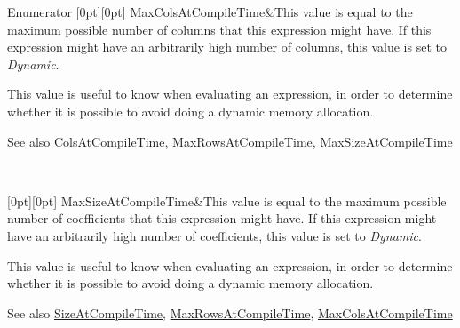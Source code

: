 \begin{DoxyEnumFields}{Enumerator}
[0pt][0pt]{}\mbox{\label{class_eigen_1_1_dense_base_a86241c772c74c04eeeb0480b99c5ab77acc3a41000cf1d29dd1a320b2a09d2a65}} 
Max\+Cols\+At\+Compile\+Time&This value is equal to the maximum possible number of columns that this expression might have. If this expression might have an arbitrarily high number of columns, this value is set to {\itshape Dynamic}.

This value is useful to know when evaluating an expression, in order to determine whether it is possible to avoid doing a dynamic memory allocation.

\begin{DoxySeeAlso}{See also}
\mbox{\hyperlink{class_eigen_1_1_dense_base_a86241c772c74c04eeeb0480b99c5ab77a787f85fd67ee5985917eb2cef6e70441}{Cols\+At\+Compile\+Time}}, \mbox{\hyperlink{class_eigen_1_1_dense_base_a86241c772c74c04eeeb0480b99c5ab77ad2baadea085372837b0e80dc93be1306}{Max\+Rows\+At\+Compile\+Time}}, \mbox{\hyperlink{class_eigen_1_1_dense_base_a86241c772c74c04eeeb0480b99c5ab77a3a459062d39cb34452518f5f201161d2}{Max\+Size\+At\+Compile\+Time}} 
\end{DoxySeeAlso}
\\
\hline

[0pt][0pt]{}\mbox{\label{class_eigen_1_1_dense_base_a86241c772c74c04eeeb0480b99c5ab77a3a459062d39cb34452518f5f201161d2}} 
Max\+Size\+At\+Compile\+Time&This value is equal to the maximum possible number of coefficients that this expression might have. If this expression might have an arbitrarily high number of coefficients, this value is set to {\itshape Dynamic}.

This value is useful to know when evaluating an expression, in order to determine whether it is possible to avoid doing a dynamic memory allocation.

\begin{DoxySeeAlso}{See also}
\mbox{\hyperlink{class_eigen_1_1_dense_base_a86241c772c74c04eeeb0480b99c5ab77a25cb495affdbd796198462b8ef06be91}{Size\+At\+Compile\+Time}}, \mbox{\hyperlink{class_eigen_1_1_dense_base_a86241c772c74c04eeeb0480b99c5ab77ad2baadea085372837b0e80dc93be1306}{Max\+Rows\+At\+Compile\+Time}}, \mbox{\hyperlink{class_eigen_1_1_dense_base_a86241c772c74c04eeeb0480b99c5ab77acc3a41000cf1d29dd1a320b2a09d2a65}{Max\+Cols\+At\+Compile\+Time}} 
\end{DoxySeeAlso}
\\
\hline


\end{DoxyEnumFields}

